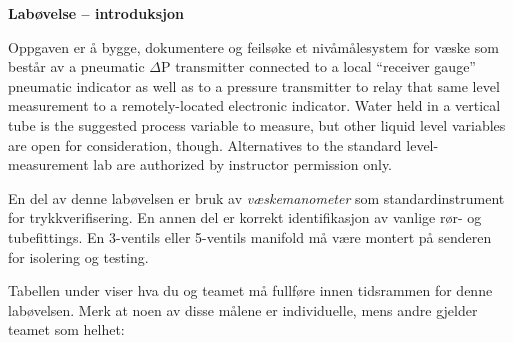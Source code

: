 

\noindent
{\bf Labøvelse -- introduksjon}

\vskip 5pt

Oppgaven er å bygge, dokumentere og feilsøke et nivåmålesystem for væske som består av a pneumatic $\Delta$P transmitter connected to a local ``receiver gauge'' pneumatic indicator as well as to a pressure transmitter to relay that same level measurement to a remotely-located electronic indicator.  Water held in a vertical tube is the suggested process variable to measure, but other liquid level variables are open for consideration, though.  Alternatives to the standard level-measurement lab are authorized by instructor permission only.

En del av denne labøvelsen er bruk av {\it væskemanometer} som standardinstrument for trykkverifisering.  En annen del er korrekt identifikasjon av vanlige rør- og tubefittings.  En 3-ventils eller 5-ventils manifold må være montert på senderen for isolering og testing.

Tabellen under viser hva du og teamet må fullføre innen tidsrammen for denne labøvelsen.  Merk at noen av disse målene er individuelle, mens andre gjelder teamet som helhet:



